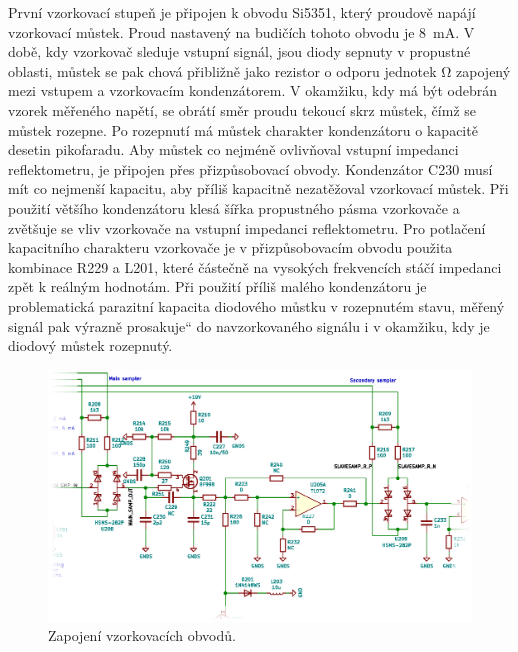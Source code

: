 První vzorkovací stupeň je připojen k obvodu Si5351, který proudově napájí vzorkovací můstek. Proud nastavený na budičích tohoto obvodu je \SI{8}{\milli\ampere}. V době, kdy vzorkovač sleduje vstupní signál, jsou diody sepnuty v propustné oblasti, můstek se pak chová přibližně jako rezistor o odporu jednotek \si{\ohm} zapojený mezi vstupem a vzorkovacím kondenzátorem. V okamžiku, kdy má být odebrán vzorek měřeného napětí, se obrátí směr proudu tekoucí skrz můstek, čímž se můstek rozepne. Po rozepnutí má můstek charakter kondenzátoru o kapacitě desetin pikofaradu. Aby můstek co nejméně ovlivňoval vstupní impedanci reflektometru, je připojen přes přizpůsobovací obvody. Kondenzátor C230 musí mít co nejmenší kapacitu, aby příliš kapacitně nezatěžoval vzorkovací můstek. Při použití většího kondenzátoru klesá šířka propustného pásma vzorkovače a zvětšuje se vliv vzorkovače na vstupní impedanci reflektometru. Pro potlačení kapacitního charakteru vzorkovače je v přizpůsobovacím obvodu použita kombinace R229 a L201, které částečně na vysokých frekvencích stáčí impedanci zpět k reálným hodnotám. Při použití příliš malého kondenzátoru je problematická parazitní kapacita diodového můstku v rozepnutém stavu, měřený signál pak výrazně \quotedblbase prosakuje\textquotedblleft{} do navzorkovaného signálu i v okamžiku, kdy je diodový můstek rozepnutý.

\begin{figure}[htbp]
\includegraphics[width=\textwidth,keepaspectratio]{images/sampler_section.eps}\caption{Zapojení vzorkovacích obvodů.}\label{sampler_section_schematic}
\end{figure}

